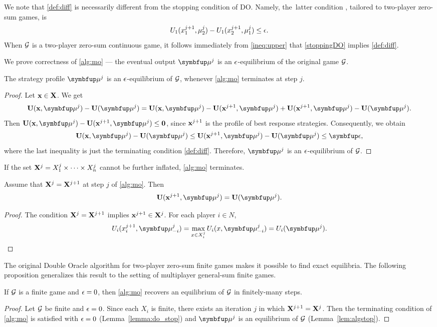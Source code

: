 We note that \eqref{def:diff} is necessarily different from the stopping condition of DO. Namely, the~latter condition \cite{McMahan03}, tailored to two-player zero-sum games, is
\begin{equation} \label{stoppingDO}
	U_1(x_1^{j+1},\mu_2^j) - U_1(x_2^{j+1},\mu_1^j) \le \epsilon.
\end{equation}
When $\mathcal{G}$ is a two-player zero-sum continuous game, it follows immediately from \eqref{ineq:upper} that \eqref{stoppingDO} implies \eqref{def:diff}.

We prove correctness of \cref{alg:mo} --- the eventual output $\bmu^j$ is an $\epsilon$-equilibrium of the original game $\mathcal{G}$.
\begin{lemma}\label{lem:algstop}
	The strategy profile $\bmu^j$ is an $\epsilon$-equilibrium of $\mathcal{G}$, whenever \cref{alg:mo} terminates at step $j$.
\end{lemma}
\begin{proof}
	Let $\mathbf{x}\in \mathbf{X}$. We get
	\[
		\bU(\bx,\bmu^j)-\bU(\bmu^j) = \bU(\bx,\bmu^j)-\bU(\bx^{j+1},\bmu^j) +  \bU(\bx^{j+1},\bmu^j)-\bU(\bmu^j).
	\]
	Then $\bU(\bx,\bmu^j)-\bU(\bx^{j+1},\bmu^j)\leq \mathbf{0}$, since $\mathbf{x}^{j+1}$ is the profile of best response strategies. Consequently, we obtain
	\[
		\bU(\bx,\bmu^j)-\bU(\bmu^j)  \le  \bU(\bx^{j+1},\bmu^j)-\bU(\bmu^j) \le \beps,
	\]
	where the last inequality is just the terminating condition \eqref{def:diff}. Therefore, $\bmu^j$ is an $\epsilon$-equilibrium of  $\mathcal{G}$.
\end{proof}

If the set $\mathbf{X}^j=X^j_1\times \dots \times X^j_n$ cannot be further inflated, \cref{alg:mo} terminates.
\begin{lemma}\label{lemma:do_stop}
	Assume that $\mathbf{X}^j=\mathbf{X}^{j+1}$ at step $j$ of \cref{alg:mo}. Then
	\[
		\bU(\bx^{j+1},\bmu^j)=\bU(\bmu^j).
	\]
\end{lemma}
\begin{proof}
	The condition $\mathbf{X}^j=\mathbf{X}^{j+1}$ implies $\mathbf{x}^{j+1}\in \mathbf{X}^{j}$. For each player $i\in N$,
	\[
		U_i(x_i^{j+1},\bmu^j_{-i})=\max\limits_{x\in X_i^j}U_i(x,\bmu^j_{-i}) =U_i(\bmu^j).
	\]
\end{proof}

The original Double Oracle algorithm for two-player zero-sum finite games \cite{McMahan03} makes it possible to find exact equilibria. The following proposition generalizes this result to the setting of multiplayer general-sum finite games.
\begin{proposition}\label{pro:Mahan}
	If $\mathcal{G}$ is a finite game and $\epsilon=0$, then \cref{alg:mo} recovers an equilibrium of $\mathcal{G}$ in finitely-many steps.
\end{proposition}
\begin{proof}
	Let $\mathcal{G}$ be finite and $\epsilon=0$. Since each $X_i$ is finite, there exists an iteration $j$  in which $\mathbf{X}^{j+1}=\mathbf{X}^j$. Then the terminating condition of \cref{alg:mo} is satisfied with $\epsilon=0$ (Lemma~\ref{lemma:do_stop}) and $\bmu^j$ is an equilibrium of $\mathcal{G}$ (Lemma~\ref{lem:algstop}).
\end{proof}

